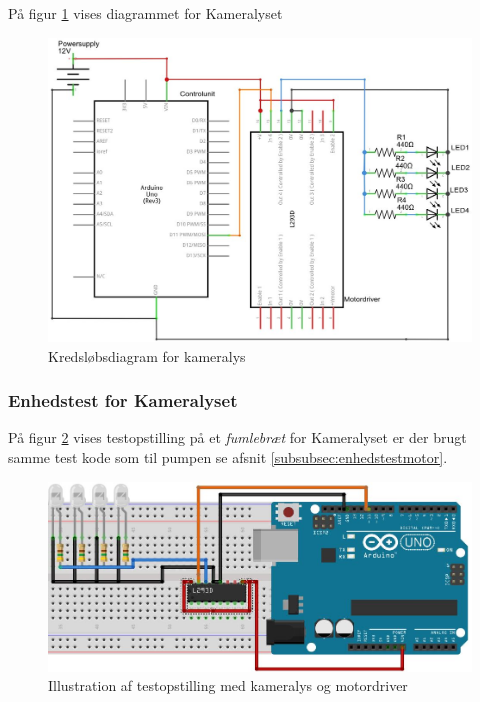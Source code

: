 På figur \ref{fig:LEDdiagram} vises diagrammet for Kameralyset
 
 \begin{figure}[H]
	\centering
	\includegraphics[width=1\textwidth]{billeder/Hardware/diagrammer/LEDdiagram.JPG}
	\caption{Kredsløbsdiagram for kameralys}
	\label{fig:LEDdiagram}
\end{figure} 

\subsubsection{Enhedstest for Kameralyset}

På figur \ref{fig:LEDbreadboard} vises testopstilling på et \textit{fumlebræt} for Kameralyset er der brugt samme test kode som til pumpen se afsnit \ref{subsubsec:enhedstestmotor}. 

\begin{figure}[H]
	\centering
	\includegraphics[width=1\textwidth]{billeder/Hardware/diagrammer/LEDbreadboard.JPG}
	\caption{Illustration af testopstilling med kameralys og motordriver}
	\label{fig:LEDbreadboard}
\end{figure}

